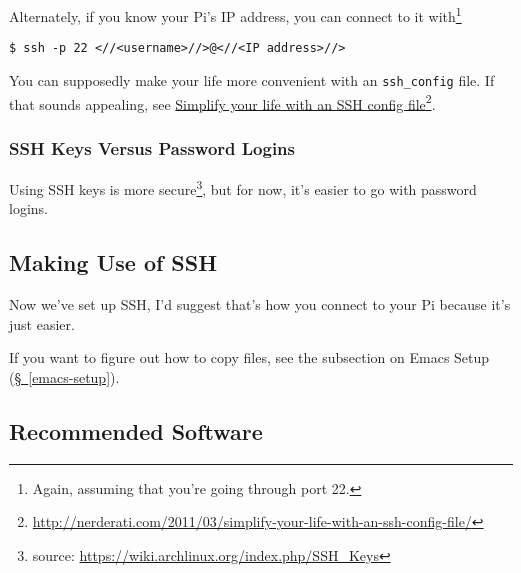 \documentclass[12pt,letterpaper]{article}
\begin{document}
Alternately, if you know your Pi's IP address, you can connect to it with\footnote{Again, assuming that you're going through port 22.}
\begin{lstlisting}
$ ssh -p 22 <//<username>//>@<//<IP address>//>
\end{lstlisting}

You can supposedly make your life more convenient with an \lstinline{ssh_config} file.  If that sounds appealing, see \href{http://nerderati.com/2011/03/simplify-your-life-with-an-ssh-config-file/}{Simplify your life with an SSH config file}\footnote{\url{http://nerderati.com/2011/03/simplify-your-life-with-an-ssh-config-file/}}.

%


\subsubsection{SSH Keys Versus Password Logins}
Using SSH keys is more secure\footnote{source: \url{https://wiki.archlinux.org/index.php/SSH_Keys}}, but for now, it's easier to go with password logins.

\subsection{Making Use of SSH}

Now we've set up SSH, I'd suggest that's how you connect to your Pi because it's just easier.

If you want to figure out how to copy files, see the subsection on Emacs Setup (\hyperref[emacs-setup]{\S~\ref{emacs-setup}}).

\subsection{Recommended Software}
\end{document}
